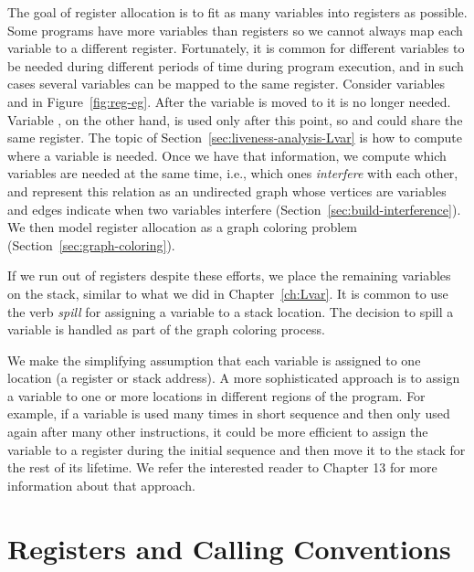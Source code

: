 \documentclass[7x10,nocrop]{TimesAPriori_MIT}%
\begin{document}
The goal of register allocation is to fit as many variables into
registers as possible. Some programs have more variables than
registers so we cannot always map each variable to a different
register. Fortunately, it is common for different variables to be
needed during different periods of time during program execution, and
in such cases several variables can be mapped to the same register.
Consider variables  and  in Figure~\ref{fig:reg-eg}.
After the variable  is moved to  it is no longer
needed.  Variable , on the other hand, is used only after this
point, so  and  could share the same register. The
topic of Section~\ref{sec:liveness-analysis-Lvar} is how to compute
where a variable is needed.  Once we have that information, we compute
which variables are needed at the same time, i.e., which ones
\emph{interfere} with each other, and represent this relation as an
undirected graph whose vertices are variables and edges indicate when
two variables interfere (Section~\ref{sec:build-interference}). We
then model register allocation as a graph coloring problem
(Section~\ref{sec:graph-coloring}).

If we run out of registers despite these efforts, we place the
remaining variables on the stack, similar to what we did in
Chapter~\ref{ch:Lvar}. It is common to use the verb \emph{spill} for
assigning a variable to a stack location. The decision to spill a
variable is handled as part of the graph coloring process.

We make the simplifying assumption that each variable is assigned to
one location (a register or stack address). A more sophisticated
approach is to assign a variable to one or more locations in different
regions of the program.  For example, if a variable is used many times
in short sequence and then only used again after many other
instructions, it could be more efficient to assign the variable to a
register during the initial sequence and then move it to the stack for
the rest of its lifetime. We refer the interested reader to
\citet{Cooper:2011aa} Chapter 13 for more information about that
approach.


\section{Registers and Calling Conventions}
\label{sec:calling-conventions}
\end{document}
